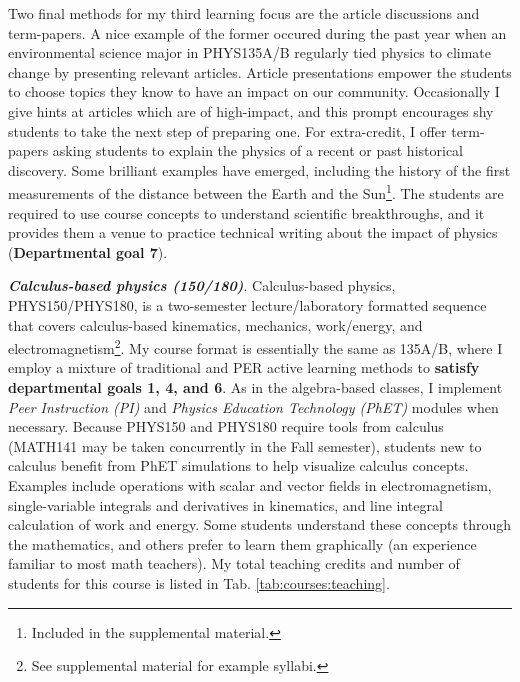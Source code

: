 \documentclass[../../../main.tex]{subfiles}
\begin{document}
Two final methods for my third learning focus are the article discussions and term-papers.  A nice example of the former occured during the past year when an environmental science major in PHYS135A/B regularly tied physics to climate change by presenting relevant articles.  Article presentations empower the students to choose topics they know to have an impact on our community.  Occasionally I give hints at articles which are of high-impact, and this prompt encourages shy students to take the next step of preparing one.  For extra-credit, I offer term-papers asking students to explain the physics of a recent or past historical discovery.  Some brilliant examples have emerged, including the history of the first measurements of the distance between the Earth and the Sun\footnote{Included in the supplemental material.}.  The students are required to use course concepts to understand scientific breakthroughs, and it provides them a venue to practice technical writing about the impact of physics (\textbf{Departmental goal 7}).  \\ \hspace{0.1cm}

\textbf{\textit{Calculus-based physics (150/180)}}. Calculus-based physics, PHYS150/PHYS180, is a two-semester lecture/laboratory formatted sequence that covers calculus-based kinematics, mechanics, work/energy, and electromagnetism\footnote{See supplemental material for example syllabi.}.  My course format is essentially the same as 135A/B, where I employ a mixture of traditional and PER active learning methods to \textbf{satisfy departmental goals 1, 4, and 6}.  As in the algebra-based classes, I implement \textit{Peer Instruction (PI)} \cite{mazur2013peer} and \textit{Physics Education Technology (PhET)} \cite{phet} modules when necessary.  Because PHYS150 and PHYS180 require tools from calculus (MATH141 may be taken concurrently in the Fall semester), students new to calculus benefit from PhET simulations to help visualize calculus concepts.  Examples include operations with scalar and vector fields in electromagnetism, single-variable integrals and derivatives in kinematics, and line integral calculation of work and energy.  Some students understand these concepts through the mathematics, and others prefer to learn them graphically (an experience familiar to most math teachers).  My total teaching credits and number of students for this course is listed in Tab. \ref{tab:courses:teaching}. \\ \hspace{0.1cm}
\end{document}
